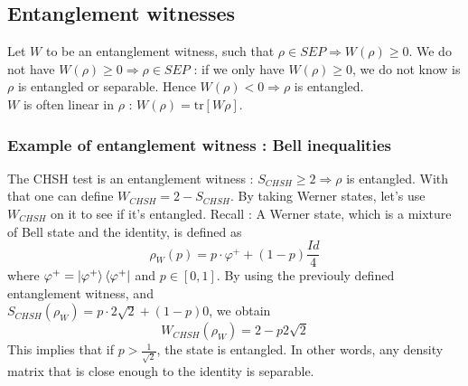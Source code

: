 \documentclass{article}
\begin{document}
\subsection{Entanglement witnesses}
Let $W$ to be an entanglement witness, such that $\rho \in SEP \Rightarrow
W(\rho) \geq 0$. We do not have $W(\rho) \geq 0 \Rightarrow \rho \in SEP$ : if
we only have $W(\rho) \geq 0$, we do not know is $\rho$ is entangled or separable.
Hence $W(\rho) < 0 \Rightarrow \rho$ is entangled.
\\\noindent
$W$ is often linear in $\rho$ : $W(\rho) = \text{tr}[W\rho]$.
\subsubsection*{Example of entanglement witness : Bell inequalities}
The CHSH test is an entanglement witness : $S_{CHSH} \geq 2 \Rightarrow \rho$ is
entangled. With that one can define $W_{CHSH} = 2 - S_{CHSH}$. By taking Werner
states, let's use $W_{CHSH}$ on it to see if it's entangled. Recall : A Werner
state, which is a mixture of Bell state and the identity, is defined as
\begin{equation}
    \rho_W(p) = p\cdot\varphi^+ + (1-p)\frac{Id}{4}
\end{equation}
where $\varphi^+ = \ket{\varphi^+}\bra{\varphi^+}$ and $p\in[0, 1]$. By using the previouly defined
entanglement witness, and\\\noindent$S_{CHSH}(\rho_W) = p \cdot 2 \sqrt 2 +
(1-p)0$, we obtain
\begin{equation}
    W_{CHSH}(\rho_W)= 2 - p 2\sqrt 2
\end{equation}
This implies that if $p>\frac{1}{\sqrt2}$, the state is entangled. In other
words, any density matrix that is close enough to the identity is separable.
\end{document}
